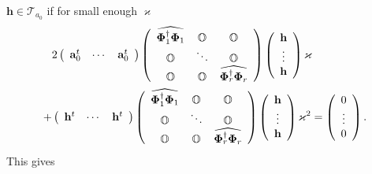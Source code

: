 \documentclass[aps,preprint]{revtex4}%
\begin{document}
$\mathbf{h\in}\mathcal{T}_{a_{0}}$ if for small enough $\varkappa$
\begin{align}
&  2\left(
\begin{array}
[c]{ccc}%
\mathbf{a}_{0}^{t} & \cdots & \mathbf{a}_{0}^{t}%
\end{array}
\right)  \left(
\begin{array}
[c]{ccc}%
\widehat{\mathbf{\Phi}_{1}^{\dagger}\mathbf{\Phi}_{1}} & \mathbb{O} &
\mathbb{O}\\
\mathbb{O} & \ddots & \mathbb{O}\\
\mathbb{O} & \mathbb{O} & \widehat{\mathbf{\Phi}_{r}^{\dagger}\mathbf{\Phi
}_{r}}%
\end{array}
\right)  \left(
\begin{array}
[c]{c}%
\mathbf{h}\\
\vdots\\
\mathbf{h}%
\end{array}
\right)  \varkappa\nonumber\\
+  &  \left(
\begin{array}
[c]{ccc}%
\mathbf{h}^{t} & \cdots & \mathbf{h}^{t}%
\end{array}
\right)  \left(
\begin{array}
[c]{ccc}%
\widehat{\mathbf{\Phi}_{1}^{\dagger}\mathbf{\Phi}_{1}} & \mathbb{O} &
\mathbb{O}\\
\mathbb{O} & \ddots & \mathbb{O}\\
\mathbb{O} & \mathbb{O} & \widehat{\mathbf{\Phi}_{r}^{\dagger}\mathbf{\Phi
}_{r}}%
\end{array}
\right)  \left(
\begin{array}
[c]{c}%
\mathbf{h}\\
\vdots\\
\mathbf{h}%
\end{array}
\right)  \varkappa^{2}=\left(
\begin{array}
[c]{c}%
0\\
\vdots\\
0
\end{array}
\right)  .
\end{align}
This gives%
\end{document}
